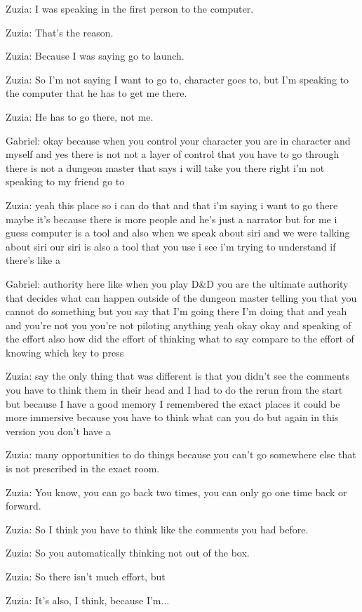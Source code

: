 Zuzia: I was speaking in the first person to the computer.

Zuzia: That's the reason.

Zuzia: Because I was saying go to launch.

Zuzia: So I'm not saying I want to go to, character goes to, but I'm speaking to the computer that he has to get me there.

Zuzia: He has to go there, not me.

Gabriel: okay because when you control your character you are in character and myself and yes there is not not a layer of control that you have to go through there is not a dungeon master that says i will take you there right i'm not speaking to my friend go to

Zuzia: yeah this place so i can do that and that i'm saying i want to go there maybe it's because there is more people and he's just a narrator but for me i guess computer is a tool and also when we speak about siri and we were talking about siri our siri is also a tool that you use i see i'm trying to understand if there's like a

Gabriel: authority here like when you play D\&D you are the ultimate authority that decides what can happen outside of the dungeon master telling you that you cannot do something but you say that I'm going there I'm doing that and yeah and you're not you you're not piloting anything yeah okay okay and speaking of the effort also how did the effort of thinking what to say compare to the effort of knowing which key to press

Zuzia: say the only thing that was different is that you didn't see the comments you have to think them in their head and I had to do the rerun from the start but because I have a good memory I remembered the exact places it could be more immersive because you have to think what can you do but again in this version you don't have a

Zuzia: many opportunities to do things because you can't go somewhere else that is not prescribed in the exact room.

Zuzia: You know, you can go back two times, you can only go one time back or forward.

Zuzia: So I think you have to think like the comments you had before.

Zuzia: So you automatically thinking not out of the box.

Zuzia: So there isn't much effort, but

Zuzia: It's also, I think, because I'm...

